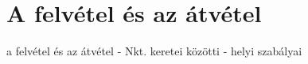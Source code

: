 % 



\section{A felvétel és az
  átvétel}


a felvétel és az átvétel - Nkt. keretei közötti - helyi szabályai


